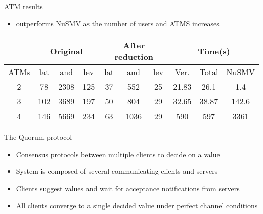 \begin{frame}{ATM results}
\begin{itemize}
 \item \biptool{} outperforms NuSMV as the number of users and ATMS increases
\end{itemize}
\begin{table}
\centering
\small{
\begin{tabular}{|c|c|c|c|c|c|c|c|c|c|}
\cline {2-10}
\multicolumn{1}{c|}{} &  \multicolumn{3}{c|}{Original} & \multicolumn{3}{c|}{After reduction} &  \multicolumn{3}{c|}{Time(s)} \\ \hline
ATMs & lat & and & lev & lat & and & lev & Ver. & Total& NuSMV \\ \hline
2 & 78 & 2308 & 125 & 37 & 552 & 25 & 21.83 & 26.1 & 1.4\\ \hline
3 & 102 & 3689 & 197 & 50 & 804 & 29 & 32.65 & 38.87 & 142.6 \\ \hline
4 & 146 & 5669 & 234 & 63 & 1036 & 29 & 590  & 597 & 3361 \\ \hline
\end{tabular}}
\end{table}
\end{frame}

\begin{frame}{The Quorum protocol}
\begin{itemize}
 \item Consensus protocols between multiple clients to decide on a value
 \item System is composed of several communicating clients and servers
 \item Clients suggest values and wait for acceptance notifications from servers
 \item All clients converge to a single decided value under perfect channel conditions
\end{itemize}
\end{frame}

